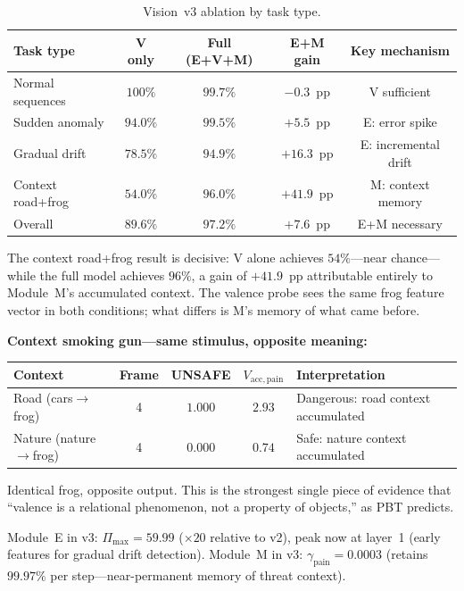 \documentclass[12pt,a4paper]{article}
\begin{document}
\begin{table}[ht]
\centering
\caption{Vision~v3 ablation by task type.}
\label{tab:v3_ablation}
\small
\begin{tabular}{@{}L{2.8cm}cccc@{}}
\toprule
\textbf{Task type} & \textbf{V only} & \textbf{Full (E+V+M)}
  & \textbf{E+M gain} & \textbf{Key mechanism} \\
\midrule
Normal sequences   & $100\%$  & $99.7\%$  & $-0.3$~pp   & V sufficient \\
Sudden anomaly     & $94.0\%$ & $99.5\%$  & $+5.5$~pp   & E: error spike \\
Gradual drift      & $78.5\%$ & $94.9\%$  & $+16.3$~pp  & E: incremental drift \\
Context road+frog  & $54.0\%$ & $96.0\%$  & $\mathbf{+41.9}$~pp & M: context memory \\
\midrule
Overall            & $89.6\%$ & $97.2\%$  & $+7.6$~pp   & E+M necessary \\
\bottomrule
\end{tabular}
\end{table}

The context road+frog result is decisive: V alone achieves $54\%$---near
chance---while the full model achieves $96\%$, a gain of $+41.9$~pp
attributable entirely to Module~M's accumulated context. The valence probe sees
the same frog feature vector in both conditions; what differs is M's memory
of what came before.

\textbf{Context smoking gun---same stimulus, opposite meaning:}

\begin{center}
\small
\begin{tabular}{@{}L{3.0cm}cccL{4.2cm}@{}}
\toprule
Context & Frame & UNSAFE & $V_{\mathrm{acc,pain}}$ & Interpretation \\
\midrule
Road (cars$\!\to\!$frog)   & 4 & $1.000$ & $2.93$ & Dangerous: road context accumulated \\
Nature (nature$\!\to\!$frog) & 4 & $0.000$ & $0.74$ & Safe: nature context accumulated \\
\bottomrule
\end{tabular}
\end{center}

Identical frog, opposite output. This is the strongest single piece of evidence
that ``valence is a relational phenomenon, not a property of objects,'' as PBT
predicts.

Module~E in v3: $\Pi_{\max} = 59.99$ ($\times 20$ relative to v2), peak now
at layer~1 (early features for gradual drift detection). Module~M in v3:
$\gamma_{\mathrm{pain}} = 0.0003$ (retains $99.97\%$ per step---near-permanent
memory of threat context).
\end{document}
